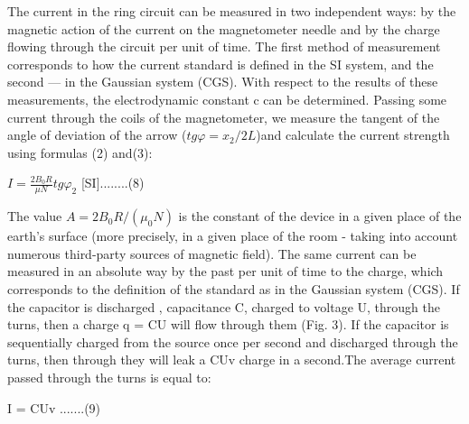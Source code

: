 \documentclass[a4paper, 12pt]{article}%
\begin{document}
The current in the ring circuit can be measured in two independent ways: by the magnetic action of the current on the magnetometer needle and by the charge flowing through the circuit per unit of time. The first method of measurement corresponds to how the current standard is defined in the SI system, and the second — in the Gaussian system (CGS). With respect to the results of these measurements, the electrodynamic constant c can be determined. Passing some current through the coils of the magnetometer, we measure the tangent of the angle of deviation of the arrow ($tg\varphi = x_2/2L$)and calculate the current strength using formulas (2) and(3):
\begin{center}
$I = \frac{2B_0R}{\mu N}tg\varphi_2$ [SI]........(8)
\end{center}
The value $A = 2B_0R/(\mu_0N)$ is the constant of the device in a given place of the earth's surface (more precisely, in a given place of the room - taking into account numerous third-party sources of magnetic field). The same current can be measured in an absolute way by the past per unit of time to the charge, which corresponds to the definition of the standard
as in the Gaussian system (CGS). If the capacitor is discharged , capacitance C, charged to voltage U, through the turns, then a charge q = CU will flow through them (Fig. 3). If the capacitor is sequentially
charged from the source once per second and discharged through the turns, then through they will leak a CUv charge in a second.The average current passed through the turns is equal to:
\begin{center}
I = CUv .......(9)
\end{center}
\end{document}
